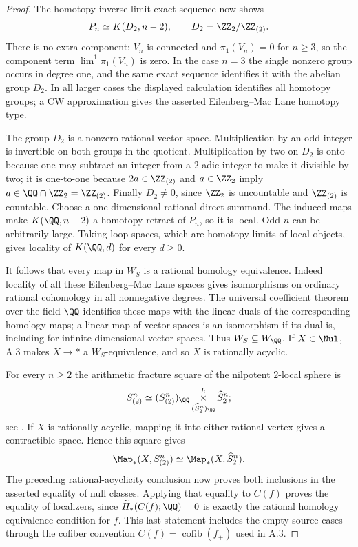 \begin{proof}
The homotopy inverse-limit exact sequence now shows
\[
 P_n\simeq K(D_2,n-2),\qquad D_2=\ZZ_2/\ZZ_{(2)}.
\]
There is no extra component: $V_n$ is connected and $\pi_1(V_n)=0$ for $n\geq3$, so the component term $\lim^1\pi_1(V_n)$ is zero. In the case $n=3$ the single nonzero group occurs in degree one, and the same exact sequence identifies it with the abelian group $D_2$. In all larger cases the displayed calculation identifies all homotopy groups; a CW approximation gives the asserted Eilenberg--Mac Lane homotopy type.

The group $D_2$ is a nonzero rational vector space. Multiplication by an odd integer is invertible on both groups in the quotient. Multiplication by two on $D_2$ is onto because one may subtract an integer from a $2$-adic integer to make it divisible by two; it is one-to-one because $2a\in\ZZ_{(2)}$ and $a\in\ZZ_2$ imply $a\in\QQ\cap\ZZ_2=\ZZ_{(2)}$. Finally $D_2\ne0$, since $\ZZ_2$ is uncountable and $\ZZ_{(2)}$ is countable. Choose a one-dimensional rational direct summand. The induced maps make $K(\QQ,n-2)$ a homotopy retract of $P_n$, so it is local. Odd $n$ can be arbitrarily large. Taking loop spaces, which are homotopy limits of local objects, gives locality of $K(\QQ,d)$ for every $d\geq0$.

It follows that every map in $W_S$ is a rational homology equivalence. Indeed locality of all these Eilenberg--Mac Lane spaces gives isomorphisms on ordinary rational cohomology in all nonnegative degrees. The universal coefficient theorem over the field $\QQ$ identifies these maps with the linear duals of the corresponding homology maps; a linear map of vector spaces is an isomorphism if its dual is, including for infinite-dimensional vector spaces. Thus $W_S\subseteq W_{\QQ}$. If $X\in\Nul$, A.3 makes $X\to *$ a $W_S$-equivalence, and so $X$ is rationally acyclic.

For every $n\geq2$ the arithmetic fracture square of the nilpotent $2$-local sphere is
\[
 S^n_{(2)}\simeq
 (S^n_{(2)})_{\QQ}\mathop{\times}\limits^h_{(\widehat S^n_2)_{\QQ}}
                    \widehat S^n_2;
\]
see \cite[Theorem 13.1.4]{FGHMayPonto2012}. If $X$ is rationally acyclic, mapping it into either rational vertex gives a contractible space. Hence this square gives
\[
 \Map_*(X,S^n_{(2)})\simeq\Map_*(X,\widehat S^n_2).
\]
The preceding rational-acyclicity conclusion now proves both inclusions in the asserted equality of null classes. Applying that equality to $C(f)$ proves the equality of localizers, since $\widetilde H_*(C(f);\QQ)=0$ is exactly the rational homology equivalence condition for $f$. This last statement includes the empty-source cases through the cofiber convention $C(f)=\operatorname{cofib}(f_+)$ used in A.3.
\end{proof}


